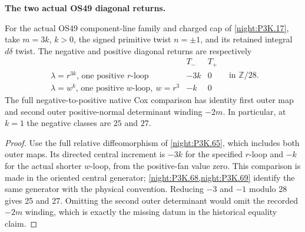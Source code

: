 \begin{proposition}\label{iv:correction:P3K.17}
\textbf{The two actual OS49 diagonal returns.}\par
For the actual OS49 component-line family and charged cap
of \cref{night:P3K.17}, take \(m=3k\), \(k>0\), the signed primitive
twist \(n=\pm1\), and its retained integral \(d\delta\) twist.
The negative and positive diagonal returns are respectively
\[
 \begin{array}{c|cc}
 &T_-&T_+\\\hline
 \lambda=r^{3k}\text{, one positive }r\text{-loop}&-3k&0\\
 \lambda=w^k\text{, one positive }w\text{-loop},\ w=r^3&-k&0
 \end{array}\quad\text{in }\mathbb Z/28.
\]
The full negative-to-positive native Cox comparison has identity
first outer map and second outer positive-normal determinant winding
\(-2m\). In particular, at \(k=1\) the negative classes are
\(25\) and \(27\).
\end{proposition}
\begin{proof}
Use the full relative diffeomorphism of \cref{night:P3K.65},
which includes both outer maps. Its directed central increment is
\(-3k\) for the specified \(r\)-loop and \(-k\) for the actual
shorter \(w\)-loop, from the positive-fan value zero. This comparison
is made in the oriented central generator; \cref{night:P3K.68,night:P3K.69}
identify the same generator with the physical convention. Reducing
\(-3\) and \(-1\) modulo 28 gives 25 and 27. Omitting the second
outer determinant would omit the recorded \(-2m\) winding, which
is exactly the missing datum in the historical equality claim.
\end{proof}


